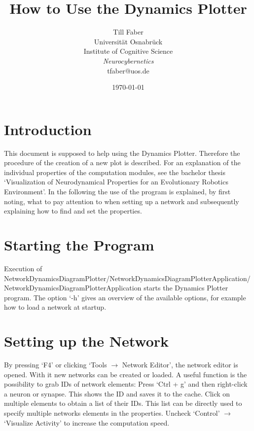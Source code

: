 \documentclass[a4paper, 12pt]{article}
\begin{document}
\title{How to Use the Dynamics Plotter}
\author{
        Till Faber \\
        Universit\"{a}t Osnabr\"{u}ck\\
        Institute of Cognitive Science\\
        \textit{Neurocybernetics}\\
        tfaber@uos.de        
        }
\date{\today}
\maketitle

\section*{Introduction}
This document is supposed to help using the Dynamics Plotter. Therefore the procedure of the creation of a new plot is described. For an explanation of the individual properties of the computation modules, see the bachelor thesis `Visualization of Neurodynamical Properties for an Evolutionary Robotics Environment'. In the following the use of the program is explained, by first noting, what to pay attention to when setting up a network and subsequently explaining how to find and set the properties. 

\section*{Starting the Program}
  Execution of NetworkDynamics\-DiagramPlotter/\-NetworkDynamics\-DiagramPlotter\-Application/\-NetworkDynamics\-DiagramPlotter\-Application starts the Dynamics Plotter program. The option `-h' gives an overview of the available options, for example how to load a network at startup. 

\section*{Setting up the Network}
   By pressing `F4' or clicking `Tools \( \rightarrow \)  Network Editor', the network editor is opened. With it new networks can be created or loaded. A useful function is the possibility to grab IDs of network elements: Press `Ctrl + g' and then right-click a neuron or synapse. This shows the ID and saves it to the cache. Click on multiple elements to obtain a list of their IDs. This list can be directly used to specify multiple networks elements in the properties. Uncheck `Control' \( \rightarrow \) `Visualize Activity' to increase the computation speed. 
   
\end{document}
